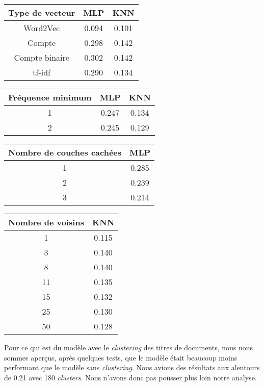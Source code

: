 \begin{center}
\begin{tabular}{|c|c|c|}
\hline
\textbf{Type de vecteur} & MLP & KNN \\ \hline
Word2Vec & 0.094 & 0.101 \\ \hline
Compte & 0.298 & 0.142 \\ \hline
Compte binaire & 0.302 & 0.142 \\ \hline
tf-idf & 0.290 & 0.134 \\ \hline
\end{tabular}
\end{center}

\begin{center}
\begin{tabular}{|c|c|c|}
\hline
\textbf{Fréquence minimum} & MLP & KNN \\ \hline
1 & 0.247 & 0.134 \\ \hline
2 & 0.245 & 0.129 \\ \hline
\end{tabular}
\end{center}

\begin{center}
\begin{tabular}{|c|c|}
\hline
\textbf{Nombre de couches cachées} & MLP \\ \hline
1 & 0.285 \\ \hline
2 & 0.239 \\ \hline
3 & 0.214 \\ \hline
\end{tabular}
\end{center}


\begin{center}
\begin{tabular}{|c|c|}
\hline
\textbf{Nombre de voisins} & KNN \\ \hline
1 & 0.115 \\ \hline
3 & 0.140 \\ \hline
8 & 0.140 \\ \hline
11 & 0.135 \\ \hline
15 & 0.132 \\ \hline
25 & 0.130 \\ \hline
50 & 0.128 \\ \hline
\end{tabular}
\end{center}

Pour ce qui est du modèle avec le \textit{clustering} des titres de documents, nous nous sommes aperçus, après quelques tests, que le modèle était beaucoup moins performant que le modèle sans \textit{clustering}. Nous avions des résultats aux alentours de 0.21 avec 180 \textit{clusters}. Nous n'avons donc pas pousser plus loin notre analyse.

